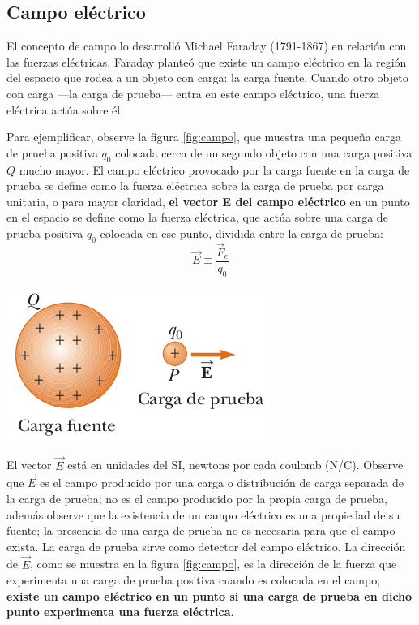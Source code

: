 \documentclass{article}
\begin{document}
	\subsection{Campo eléctrico}
El concepto de campo lo desarrolló Michael Faraday (1791-1867) en relación con las fuerzas eléctricas. Faraday planteó que existe un campo eléctrico en la región del espacio que rodea a un objeto con carga: la carga fuente. Cuando otro objeto con carga —la carga de prueba— entra en este campo eléctrico, una fuerza eléctrica actúa sobre él. 

Para ejemplificar, observe la figura \ref{fig:campo}, que muestra una pequeña carga de prueba positiva $q_0$ colocada cerca de un segundo objeto con una carga positiva $Q$ mucho mayor. El campo eléctrico provocado por la carga fuente en la carga de prueba se define como la fuerza eléctrica sobre la carga de prueba por carga unitaria, o para mayor claridad, \textbf{el vector E del campo eléctrico} en un punto en el espacio se define como la fuerza eléctrica, que actúa sobre una carga de prueba positiva $q_0$ colocada en ese punto, dividida entre la carga de prueba:
$$
\vec{E}\equiv \frac{\vec{F}_e}{q_0}
$$

\begin{center}
	\includegraphics[scale=0.50]{figuras/campo-1.png}
\label{fig:campo}
\end{center}

El vector $\vec{E}$ está en unidades del SI, newtons por cada coulomb (N/C). Observe que $\vec{E}$ es el campo producido por una carga o distribución de carga separada de la carga de prueba; no es el campo producido por la propia carga de prueba, además observe que la existencia de un campo eléctrico es una propiedad de su fuente; la presencia de una carga de prueba no es necesaria para que el campo exista. La carga de prueba sirve como detector del campo eléctrico. La dirección de $\vec{E}$, como se muestra en la figura \ref{fig:campo}, es la dirección de la fuerza que experimenta una carga de prueba positiva cuando es colocada en el campo; \textbf{existe un campo eléctrico en un punto si una carga de prueba en dicho punto experimenta una fuerza eléctrica}.
\end{document}
